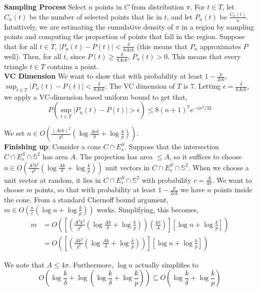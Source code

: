 \textbf{Sampling Process} Select $n$ points in $C$ from distribution $\pi$. For $t \in T$, let $C_n(t)$ be the number of selected points that lie in $t$, and let $P_n(t)$ be $\frac{C_n(t)}{n}$. Intuitively, we are estimating the cumulative density of $\pi$ in a region by sampling points and computing the proportion of points that fall in the region. Suppose that for all $t \in T$, $|P_n(t) - P(t)| < \frac{\delta}{8Ack}$ (this means that $P_n$ approximates $P$ well). Then, for all $t$, since $P(t) \geq \frac{\delta}{8Ack}$, $P_n(t) > 0$. This means that every triangle $t \in T$ contains a point.
\\

\textbf{VC Dimension} We want to show that with probability at least $1-\frac{p}{2ck}$, $\sup_{t \in T} |P_n(t) - P(t)| < \frac{\delta}{8Ack}$. The VC dimension of $T$ is 7. Letting $\epsilon = \frac{\delta}{8Ack}$, we apply a VC-dimension based uniform bound to get that,
\[ P(\sup_{t \in T} |P_n(t) - P(t)| > \epsilon) \leq 8(n+1)^7 e^{-n\epsilon^2/32} \]

We set $n \in O(\frac{(Ack)^2}{\delta^2} (\log{\frac{Ack}{\delta}} + \log{\frac{k}{p}}))$.
\\

\textbf{Finishing up}: Consider a cone $C \cap E^S_s$. Suppose that the intersection $C \cap E^S_s \cap \mathbb {S}^2$ has area $A$. The projection has area $\leq A$, so it suffices to choose $n \in O(\frac{A^2k^2}{\delta^2} (\log{\frac{Ak}{\delta}} + \log{\frac{k}{p}}))$ unit vectors in $C \cap E^S_s \cap \mathbb {S}^2$. When we choose a unit vector at random, it lies in $C \cap E^S_s \cap \mathbb {S}^2$ with probability $c = \frac{A}{4\pi}$. We want to choose $m$ points, so that with probability at least $1-\frac{p}{2ck}$ we have $n$ points inside the cone. From a standard Chernoff bound argument, $m \in O(\frac{n}{c}(\log{n} + \log{\frac{k}{p}} ))$ works. Simplifying, this becomes,
\begin{align*}
m &= O\left(\left[\left(\frac{A^2k^2}{\delta^2} \left(\log{\frac{Ak}{\delta}} + \log{\frac{k}{p}}\right)\right)\left(\frac{4\pi}{A}\right)\right]\left[ \log{n} + \log{\frac{k}{p}} \right]\right) \\
&= O\left( \left[\left(\frac{Ak^2}{\delta^2} \left(\log{\frac{Ak}{\delta}} + \log{\frac{k}{p}}\right)\right)\right]\left[ \log{n} + \log{\frac{k}{p}} \right] \right)
\end{align*}

We note that $A \leq 4\pi$. Furthermore, $\log{n}$ actually simplifies to
\[ O(\log{\frac{k}{\delta}} + \log(\log{\frac{k}{\delta}} + \log{\frac{k}{p}})) \subseteq O(\log{\frac{k}{\delta}} + \log{\frac{k}{p}}) \]

